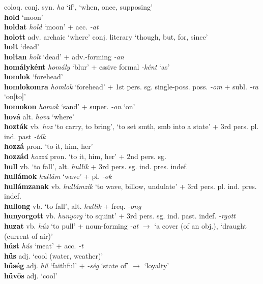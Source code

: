 \documentclass[11pt]{article}
\begin{document}
coloq. conj. syn. \emph{ha} `if', `when, once, supposing'
\\ \textbf{hold} `moon' \\ \textbf{holdat} \emph{hold} `moon' +
acc. \emph{-at} \\ \textbf{holott} adv. archaic `where'
\textbar\textbar{} conj. literary `though, but, for, since'
\\ \textbf{holt} `dead' \\ \textbf{holtan} \emph{holt} `dead' +
adv.\hyp{}forming \emph{-an} \\ \textbf{homályként} \emph{homály}
`blur' + essive formal \emph{-ként} `as' \\ \textbf{homlok} `forehead'
\\ \textbf{homlokomra} \emph{homlok} `forehead' + 1st
pers. sg. single\hyp{}poss. poss. \emph{-om} + subl. \emph{-ra}
`on[to]' \\ \textbf{homokon} \emph{homok} `sand' + super. \emph{-on}
`on' \\ \textbf{hová} alt. \emph{hova} `where' \\ \textbf{hozták}
vb. \emph{hoz} `to carry, to bring', `to set smth, smb into a state' +
3rd pers. pl. ind. past \emph{-ták} \\ \textbf{hozzá} pron. `to it,
him, her' \\ \textbf{hozzád} \emph{hozzá} pron. `to it, him, her' +
2nd pers. sg. \\ \textbf{hull} vb. `to fall', alt. \emph{hullik} + 3rd
pers. sg. ind. pres. indef. \\ \textbf{hullámok} \emph{hullám} `wave'
+ pl. \emph{-ok} \\ \textbf{hullámzanak} vb. \emph{hullámzik} `to
wave, billow, undulate' + 3rd
pers. pl. ind. pres. indef. \\ \textbf{hullong} vb. `to fall',
alt. \emph{hullik} + freq. \emph{-ong} \\ \textbf{hunyorgott}
vb. \emph{hunyorg} `to squint' + 3rd
pers. sg. ind. past. indef. \emph{-rgott} \\ \textbf{huzat}
vb. \emph{húz} `to pull' + noun\hyp{}forming \emph{-at} $\rightarrow$
`a cover (of an obj.), `draught (current of air)' \\ \textbf{húst}
\emph{hús} `meat' + acc. \emph{-t} \\ \textbf{hűs} adj. `cool (water,
weather)' \\ \textbf{hűség} adj. \emph{hű} `faithful' + \emph{-ség}
`state of' $\rightarrow$ `loyalty' \\ \textbf{hűvös} adj. `cool' \\
\end{document}
